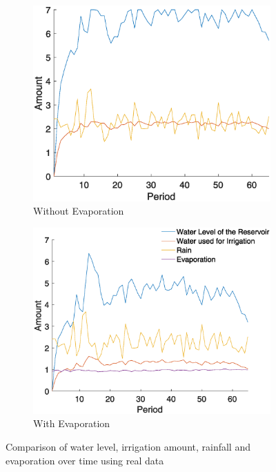 \documentclass[12pt, a4paper, oneside]{article}
\begin{document}
\begin{figure}[h]
\begin{subfigure}{0.5\textwidth}
	\centering
	\includegraphics[width=1\textwidth]{figures/results-opt-irrigation-over-time-evap-inactive.eps}
	\caption{Without Evaporation}
	\label{fig:rainfall-real-data}
\end{subfigure}%
\begin{subfigure}{.5\textwidth}
	\centering
	\includegraphics[width=1\textwidth]{figures/results-opt-irrigation-over-time-evap-active.eps}
	\caption{With Evaporation}
	\label{fig:value-function}
\end{subfigure}
\caption{Comparison of water level, irrigation amount, rainfall and evaporation over time using real data}
\label{fig:without-vs-with-evaporation}
\end{figure}
\end{document}
